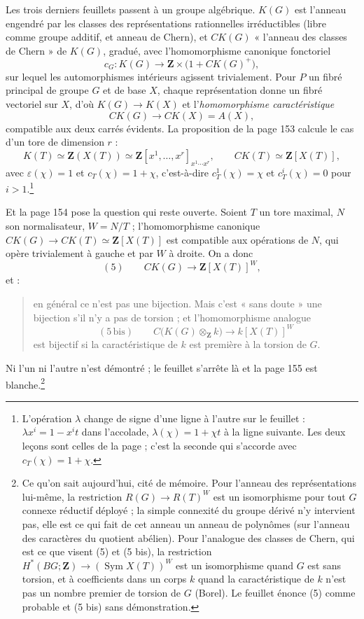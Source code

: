 \documentclass[11pt,a4paper]{article}
\begin{document}
Les trois derniers feuillets passent à un groupe algébrique. $K(G)$ est
l'anneau engendré par les classes des représentations rationnelles
irréductibles (libre comme groupe additif, et anneau de Chern), et
$CK(G)$ « l'anneau des classes de Chern » de $K(G)$, gradué, avec
l'homomorphisme canonique fonctoriel
\[
c_{G} \colon K(G) \longrightarrow
\mathbf{Z} \times \bigl( 1 + CK(G)^{+} \bigr) ,
\]
sur lequel les automorphismes intérieurs agissent trivialement. Pour $P$ un
fibré principal de groupe $G$ et de base $X$, chaque représentation donne un
fibré vectoriel sur $X$, d'où $K(G) \to K(X)$ et l'\emph{homomorphisme
caractéristique}
\[
CK(G) \longrightarrow CK(X) = A(X) ,
\]
compatible aux deux carrés évidents. La proposition de la page 153 calcule le
cas d'un tore de dimension $r$ :
\[
K(T) \simeq \mathbf{Z}(X(T))
\simeq \mathbf{Z}[x^{1}, \ldots, x^{r}]_{x^{1}\cdots x^{r}} ,
\qquad
CK(T) \simeq \mathbf{Z}[X(T)] ,
\]
avec $\varepsilon(\chi) = 1$ et $c_{T}(\chi) = 1 + \chi$, c'est-à-dire
$c_{T}^{1}(\chi) = \chi$ et $c^{i}_{T}(\chi) = 0$ pour $i >
1$.\footnote{L'opération $\lambda$ change de signe d'une ligne à l'autre sur le
feuillet : $\lambda x^{i} = 1 - x^{i}t$ dans l'accolade, $\lambda(\chi) = 1 +
\chi t$ à la ligne suivante. Les deux leçons sont celles de la page ; c'est la
seconde qui s'accorde avec $c_{T}(\chi) = 1 + \chi$.}

Et la page 154 pose la question qui reste ouverte. Soient $T$ un tore maximal,
$N$ son normalisateur, $W = N/T$ ; l'homomorphisme canonique $CK(G) \to
CK(T) \simeq \mathbf{Z}[X(T)]$ est compatible aux opérations de $N$, qui opère
trivialement à gauche et par $W$ à droite. On a donc
\[
(5)\qquad CK(G) \longrightarrow \mathbf{Z}[X(T)]^{W} ,
\]
et :
\begin{quote}
en général ce n'est pas une bijection. Mais c'est « sans doute » une bijection
s'il n'y a pas de torsion ; et l'homomorphisme analogue
\[
(5\,\mathrm{bis})\qquad C\bigl( K(G) \otimes_{\mathbf{Z}} k \bigr)
\longrightarrow k[X(T)]^{W}
\]
est bijectif si la caractéristique de $k$ est première à la torsion de $G$.
\end{quote}
Ni l'un ni l'autre n'est démontré ; le feuillet s'arrête là et la page 155 est
blanche.\footnote{Ce qu'on sait aujourd'hui, cité de mémoire. Pour l'anneau des
représentations lui-même, la restriction $R(G) \to R(T)^{W}$ est un
isomorphisme pour tout $G$ connexe réductif déployé ; la simple connexité du
groupe dérivé n'y intervient pas, elle est ce qui fait de cet anneau un anneau
de polynômes (sur l'anneau des caractères du quotient abélien). Pour
l'analogue des classes de Chern, qui est ce que visent (5) et (5 bis), la
restriction $H^{*}(BG;\mathbf{Z}) \to (\operatorname{Sym}X(T))^{W}$ est un
isomorphisme quand $G$ est sans torsion, et à coefficients dans un corps $k$
quand la caractéristique de $k$ n'est pas un nombre premier de torsion de
$G$ (Borel). Le feuillet énonce (5) comme probable et (5 bis) sans
démonstration.}
\end{document}

